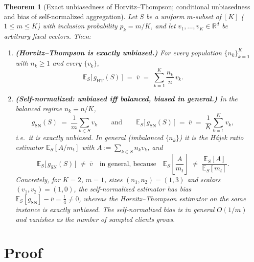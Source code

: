 \documentclass[11pt]{article}
\newtheorem{theorem}{Theorem}
\theoremstyle{definition}
\theoremstyle{remark}
\begin{document}
\begin{theorem}[Exact unbiasedness of Horvitz--Thompson; conditional unbiasedness and bias of self-normalized aggregation]
\label{thm:main}
Let $S$ be a uniform $m$-subset of $[K]$ ($1\le m\le K$) with inclusion probability $p_k=m/K$, and let $v_1,\dots,v_K\in\mathbb{R}^d$ be arbitrary fixed vectors. Then:
\begin{enumerate}
  \item[\textnormal{(i)}] \textbf{(Horvitz--Thompson is exactly unbiased.)} For every population $\{n_k\}_{k=1}^{K}$ with $n_k\ge1$ and every $\{v_k\}$,
  \[
  \mathbb{E}_S\big[\,g_{\mathrm{HT}}(S)\,\big]\;=\;\bar v\;=\;\sum_{k=1}^{K}\frac{n_k}{n}\,v_k .
  \]
  \item[\textnormal{(ii)}] \textbf{(Self-normalized: unbiased iff balanced, biased in general.)} In the balanced regime $n_k\equiv n/K$,
  \[
  g_{\mathrm{SN}}(S)\;=\;\frac{1}{m}\sum_{k\in S}v_k
  \qquad\text{and}\qquad
  \mathbb{E}_S\big[\,g_{\mathrm{SN}}(S)\,\big]\;=\;\bar v\;=\;\frac{1}{K}\sum_{k=1}^{K}v_k ,
  \]
  i.e.\ it is exactly unbiased. In general (imbalanced $\{n_k\}$) it is the H\'ajek ratio estimator $\mathbb{E}_S[A/m_t]$ with $A:=\sum_{k\in S}n_k v_k$, and
  \[
  \mathbb{E}_S\big[\,g_{\mathrm{SN}}(S)\,\big]\;\ne\;\bar v
  \quad\text{in general, because}\quad
  \mathbb{E}_S\!\left[\frac{A}{m_t}\right]\;\ne\;\frac{\mathbb{E}_S[A]}{\mathbb{E}_S[m_t]} .
  \]
  Concretely, for $K=2$, $m=1$, sizes $(n_1,n_2)=(1,3)$ and scalars $(v_1,v_2)=(1,0)$, the self-normalized estimator has bias $\mathbb{E}_S[g_{\mathrm{SN}}]-\bar v=\tfrac14\ne 0$, whereas the Horvitz--Thompson estimator on the same instance is exactly unbiased. The self-normalized bias is in general $O(1/m)$ and vanishes as the number of sampled clients grows.
\end{enumerate}
\end{theorem}

\section*{Proof}
\end{document}
